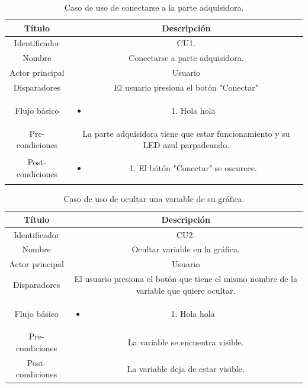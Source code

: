 \begin{table}
	\centering
	\caption{Caso de uso de conectarse a la parte adquisidora.}
	\centering
	\begin{tabular}{c c}    
		\toprule
		\textbf{Título }     & \textbf{Descripción} \\
		\midrule
		Identificador		&  CU1. \\
		Nombre				&   Conectarse a parte adquisidora. \\
		Actor principal		&   Usuario \\
		Disparadores		&   El usuario presiona el botón "Conectar" \\
		Flujo básico		&   \begin{itemize}
			\item{1.} Hola hola
		\end{itemize}\\
		Pre-condiciones		&   La parte adquisidora tiene que estar funcionamiento y su LED azul parpadeando. \\
		Post-condiciones	&   \begin{itemize}\item{1.} El bótón "Conectar" se oscurece.\end{itemize}\\
		\bottomrule
	\end{tabular}
\label{tab:caso-conectar}
\end{table}

\begin{table}
	\centering
	\caption{Caso de uso de ocultar una variable de su gráfica.}
	\centering
	\begin{tabular}{c c}    
		\toprule
		\textbf{Título }     & \textbf{Descripción} \\
		\midrule
		Identificador		&  CU2. \\
		Nombre				&   Ocultar variable en la gráfica. \\
		Actor principal		&   Usuario \\
		Disparadores		&   El usuario presiona el botón que tiene el mismo nombre de la variable que quiere ocultar. \\
		Flujo básico		&   \begin{itemize}
			\item{1.} Hola hola
		\end{itemize}\\
		Pre-condiciones		&   La variable se encuentra visible. \\
		Post-condiciones	&   La variable deja de estar visible.\\
		\bottomrule
	\end{tabular}
\label{tab:caso-ocultar}
\end{table}

